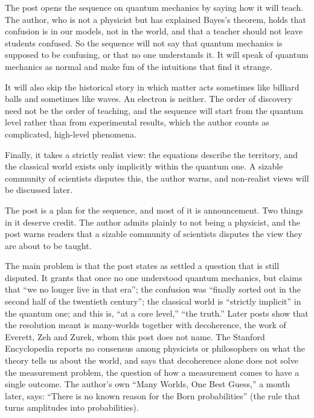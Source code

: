 \begin{afterword}
\summaryhead

The post opens the sequence on quantum mechanics by saying how it will teach. The author, who is not a physicist but has explained Bayes's theorem, holds that confusion is in our models, not in the world, and that a teacher should not leave students confused. So the sequence will not say that quantum mechanics is supposed to be confusing, or that no one understands it. It will speak of quantum mechanics as normal and make fun of the intuitions that find it strange.

It will also skip the historical story in which matter acts sometimes like billiard balls and sometimes like waves. An electron is neither. The order of discovery need not be the order of teaching, and the sequence will start from the quantum level rather than from experimental results, which the author counts as complicated, high-level phenomena.

Finally, it takes a strictly realist view: the equations describe the territory, and the classical world exists only implicitly within the quantum one. A sizable community of scientists disputes this, the author warns, and non-realist views will be discussed later.

\responsehead

The post is a plan for the sequence, and most of it is announcement. Two things in it deserve credit. The author admits plainly to not being a physicist, and the post warns readers that a sizable community of scientists disputes the view they are about to be taught.

The main problem is that the post states as settled a question that is still disputed. It grants that once no one understood quantum mechanics, but claims that ``we no longer live in that era''; the confusion was ``finally sorted out in the second half of the twentieth century''; the classical world is ``strictly implicit'' in the quantum one; and this is, ``at a core level,'' ``the truth.'' Later posts show that the resolution meant is many-worlds together with decoherence, the work of Everett, Zeh and Zurek, whom this post does not name. The Stanford Encyclopedia reports no consensus among physicists or philosophers on what the theory tells us about the world, and says that decoherence alone does not solve the measurement problem, the question of how a measurement comes to have a single outcome. The author's own ``Many Worlds, One Best Guess,'' a month later, says: ``There is no known reason for the Born probabilities'' (the rule that turns amplitudes into probabilities).


\end{afterword}
